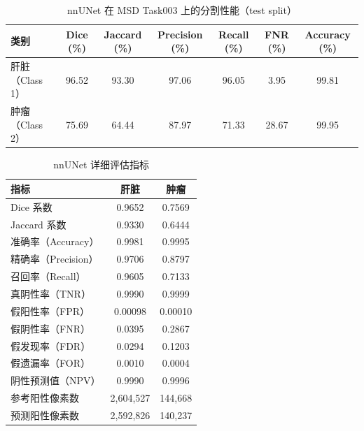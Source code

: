 \documentclass{article}
\begin{document}
	\begin{table}[H]
		\centering
		\caption{nnUNet 在 MSD Task003 上的分割性能（test split）}
		\begin{tabular}{lcccccc}
			\hline
			\textbf{类别} & \textbf{Dice (\%)} & \textbf{Jaccard (\%)} & \textbf{Precision (\%)} & \textbf{Recall (\%)} & \textbf{FNR (\%)} & \textbf{Accuracy (\%)} \\
			\hline
			肝脏（Class 1）  & 96.52 & 93.30 & 97.06 & 96.05 & 3.95  & 99.81 \\
			肿瘤（Class 2）  & 75.69 & 64.44 & 87.97 & 71.33 & 28.67 & 99.95 \\
			\hline
		\end{tabular}
	\end{table}
	
	\begin{table}[H]
		\centering
		\caption{nnUNet 详细评估指标}
		\begin{tabular}{lcc}
			\hline
			\textbf{指标} & \textbf{肝脏} & \textbf{肿瘤} \\
			\hline
			Dice 系数             & 0.9652   & 0.7569   \\
			Jaccard 系数          & 0.9330   & 0.6444   \\
			准确率（Accuracy）    & 0.9981   & 0.9995   \\
			精确率（Precision）   & 0.9706   & 0.8797   \\
			召回率（Recall）      & 0.9605   & 0.7133   \\
			真阴性率（TNR）       & 0.9990   & 0.9999   \\
			假阳性率（FPR）       & 0.00098  & 0.00010  \\
			假阴性率（FNR）       & 0.0395   & 0.2867   \\
			假发现率（FDR）       & 0.0294   & 0.1203   \\
			假遗漏率（FOR）       & 0.0010   & 0.0004   \\
			阴性预测值（NPV）     & 0.9990   & 0.9996   \\
			参考阳性像素数        & 2{,}604{,}527 & 144{,}668 \\
			预测阳性像素数        & 2{,}592{,}826 & 140{,}237 \\
			\hline
		\end{tabular}
	\end{table}
	
\end{document}
